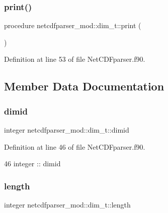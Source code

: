 \subsubsection{\texorpdfstring{print()}{print()}}
{\footnotesize\ttfamily procedure netcdfparser\+\_\+mod\+::dim\+\_\+t\+::print (\begin{DoxyParamCaption}{ }\end{DoxyParamCaption})\hspace{0.3cm}{\ttfamily [private]}}



Definition at line 53 of file Net\+C\+D\+Fparser.\+f90.



\subsection{Member Data Documentation}
\mbox{\label{structnetcdfparser__mod_1_1dim__t_ae0eee1b309e61daefc73868795c35cc9}} 
\subsubsection{\texorpdfstring{dimid}{dimid}}
{\footnotesize\ttfamily integer netcdfparser\+\_\+mod\+::dim\+\_\+t\+::dimid\hspace{0.3cm}{\ttfamily [private]}}



Definition at line 46 of file Net\+C\+D\+Fparser.\+f90.


\begin{DoxyCode}
46         \textcolor{keywordtype}{integer} :: dimid
\end{DoxyCode}
\mbox{\label{structnetcdfparser__mod_1_1dim__t_ad099f35ecc70f2370e69eddfa21235dd}} 
\subsubsection{\texorpdfstring{length}{length}}
{\footnotesize\ttfamily integer netcdfparser\+\_\+mod\+::dim\+\_\+t\+::length\hspace{0.3cm}{\ttfamily [private]}}



